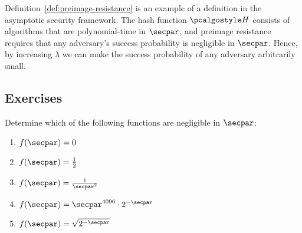 
\begin{remark}
  Definition~\ref{def:preimage-resistance} is an example of a definition in the asymptotic security framework.
  The hash function $\algo{H}$ consists of algorithms that are polynomial-time in $\secpar$, and preimage resistance requires that any \ppt adversary's success probability is negligible in $\secpar$.
  Hence, by increasing $\lambda$ we can make the success probability of any \ppt adversary arbitrarily small.
\end{remark}


\subsection{Exercises}

\begin{exercise}\label{ex:negligible-functions}
  Determine which of the following functions are negligible in $\secpar$:
  \begin{enumerate}
    \item $f(\secpar) = 0$
    \item $f(\secpar) = \frac{1}{2}$
    \item $f(\secpar) = \frac{1}{\secpar^2}$
    \item $f(\secpar) = \secpar^{4096} \cdot 2^{-\secpar}$
    \item $f(\secpar) = \sqrt{2^{-\secpar}}$
  \end{enumerate}
\end{exercise}

